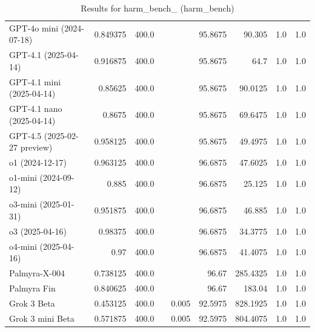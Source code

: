 \begin{table}[htp]
{\begin{tabular}{lrrrrrrrr}
GPT-4o mini (2024-07-18) & 0.849375 & 400.0 &  &  & 95.8675 & 90.305 & 1.0 & 1.0 \\
GPT-4.1 (2025-04-14) & 0.916875 & 400.0 &  &  & 95.8675 & 64.7 & 1.0 & 1.0 \\
GPT-4.1 mini (2025-04-14) & 0.85625 & 400.0 &  &  & 95.8675 & 90.0125 & 1.0 & 1.0 \\
GPT-4.1 nano (2025-04-14) & 0.8675 & 400.0 &  &  & 95.8675 & 69.6475 & 1.0 & 1.0 \\
GPT-4.5 (2025-02-27 preview) & 0.958125 & 400.0 &  &  & 95.8675 & 49.4975 & 1.0 & 1.0 \\
o1 (2024-12-17) & 0.963125 & 400.0 &  &  & 96.6875 & 47.6025 & 1.0 & 1.0 \\
o1-mini (2024-09-12) & 0.885 & 400.0 &  &  & 96.6875 & 25.125 & 1.0 & 1.0 \\
o3-mini (2025-01-31) & 0.951875 & 400.0 &  &  & 96.6875 & 46.885 & 1.0 & 1.0 \\
o3 (2025-04-16) & 0.98375 & 400.0 &  &  & 96.6875 & 34.3775 & 1.0 & 1.0 \\
o4-mini (2025-04-16) & 0.97 & 400.0 &  &  & 96.6875 & 41.4075 & 1.0 & 1.0 \\
Palmyra-X-004 & 0.738125 & 400.0 &  &  & 96.67 & 285.4325 & 1.0 & 1.0 \\
Palmyra Fin & 0.840625 & 400.0 &  &  & 96.67 & 183.04 & 1.0 & 1.0 \\
Grok 3 Beta & 0.453125 & 400.0 &  & 0.005 & 92.5975 & 828.1925 & 1.0 & 1.0 \\
Grok 3 mini Beta & 0.571875 & 400.0 &  & 0.005 & 92.5975 & 804.4075 & 1.0 & 1.0 \\
\bottomrule
\end{tabular}}
\caption{Results for harm_bench_ (harm_bench)}
\label{fig:harm_bench_ (harm_bench)}
\end{table}